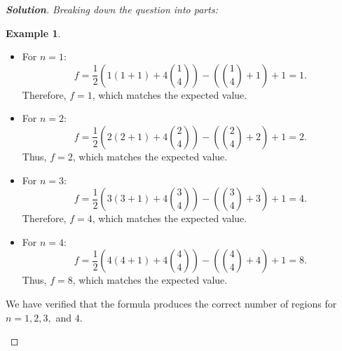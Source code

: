 \documentclass[12pt]{article}
\theoremstyle{definition}
\newtheorem{example}{Example}
\newenvironment{solution}
  {\begin{mdframed}[linewidth=0.5pt, roundcorner=10pt, linecolor=black]\begin{proof}[\bfseries Solution]}
  {\qedhere\end{proof}\end{mdframed}}
\begin{document}
\begin{solution} {\emph{Breaking down the question into parts:}}
\begin{example}
      \begin{itemize}
          \item For \( n = 1 \):
          \[
          f = \frac{1}{2} \left( 1(1+1) + 4 \binom{1}{4} \right) - \left( \binom{1}{4} + 1 \right) + 1 = 1.
          \]
          Therefore, \( f = 1 \), which matches the expected value.
      
          \item For \( n = 2 \):
          \[
          f = \frac{1}{2} \left( 2(2+1) + 4 \binom{2}{4} \right) - \left( \binom{2}{4} + 2 \right) + 1 = 2.
          \]
          Thus, \( f = 2 \), which matches the expected value.
      
          \item For \( n = 3 \):
          \[
          f = \frac{1}{2} \left( 3(3+1) + 4 \binom{3}{4} \right) - \left( \binom{3}{4} + 3 \right) + 1 = 4.
          \]
          Therefore, \( f = 4 \), which matches the expected value.
      
          \item For \( n = 4 \):
          \[
          f = \frac{1}{2} \left( 4(4+1) + 4 \binom{4}{4} \right) - \left( \binom{4}{4} + 4 \right) + 1 = 8.
          \]
          Thus, \( f = 8 \), which matches the expected value.
      \end{itemize}
      
      We have verified that the formula produces the correct number of regions for \( n = 1, 2, 3, \) and \( 4 \).
      \end{example}


\end{solution}


  


  

  

\end{document}
